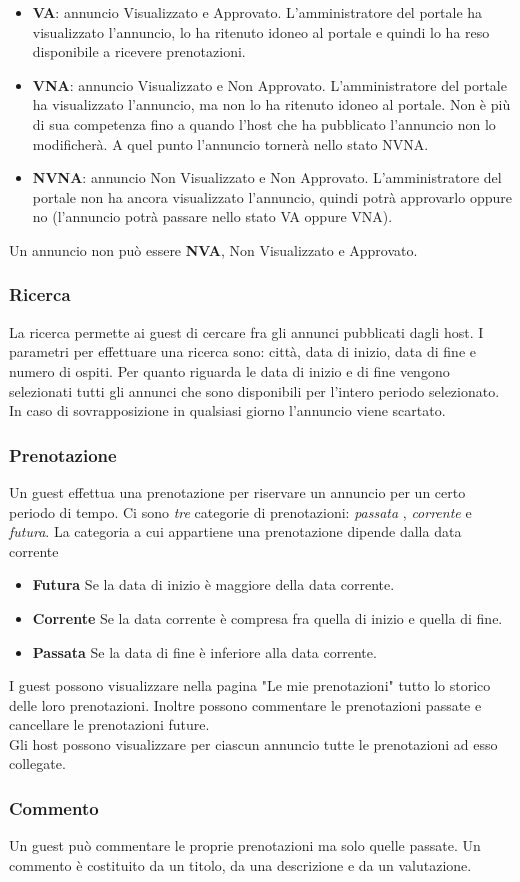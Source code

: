 \documentclass[1_relazione.tex]{subfiles}
\begin{document}
\begin{itemize}
\item \textbf{VA}: annuncio Visualizzato e Approvato. L'amministratore del portale ha visualizzato l'annuncio, lo ha ritenuto idoneo al portale e quindi lo ha reso disponibile a ricevere prenotazioni.
\item \textbf{VNA}: annuncio Visualizzato e Non Approvato. L'amministratore del portale ha visualizzato l'annuncio, ma non lo ha ritenuto idoneo al portale. Non è più di sua competenza fino a quando l'host che ha pubblicato l'annuncio non lo modificherà. A quel punto l'annuncio tornerà nello stato NVNA.
\item \textbf{NVNA}: annuncio Non Visualizzato e Non Approvato. L'amministratore del portale non ha ancora visualizzato l'annuncio, quindi potrà approvarlo oppure no (l'annuncio potrà passare nello stato VA oppure VNA).
\end{itemize}
Un annuncio non può essere \textbf{NVA},  Non Visualizzato e Approvato. 

\subsubsection{Ricerca} 
La ricerca permette ai guest di cercare fra gli annunci pubblicati dagli host. I parametri per effettuare una ricerca sono: città, data di inizio, data di fine e numero di ospiti. Per quanto riguarda le data di inizio e di fine vengono selezionati tutti gli annunci che sono disponibili per l'intero periodo selezionato. In caso di sovrapposizione in qualsiasi giorno l'annuncio viene scartato.

\subsubsection{Prenotazione} 
Un guest effettua una prenotazione per riservare un annuncio per un certo periodo di tempo. Ci sono \textit{tre} categorie di prenotazioni: \textit{passata} , \textit{corrente} e \textit{futura}.  La categoria a cui appartiene una prenotazione dipende dalla data corrente \\
\begin{itemize}
\item \textbf{Futura} Se la data di inizio è maggiore della data corrente.
\item \textbf{Corrente} Se la data corrente è compresa fra quella di inizio e quella di fine.
\item \textbf{Passata} Se la data di fine è inferiore alla data corrente.
\end{itemize}
I guest possono visualizzare nella pagina "Le mie prenotazioni" tutto lo storico delle loro prenotazioni. Inoltre possono commentare le prenotazioni passate e cancellare le prenotazioni future.\\
Gli host possono visualizzare per ciascun annuncio tutte le prenotazioni ad esso collegate.

\subsubsection{Commento} 
Un guest può commentare le proprie prenotazioni ma solo quelle passate. Un commento è costituito da un titolo, da una descrizione e da un valutazione. 
\end{document}
